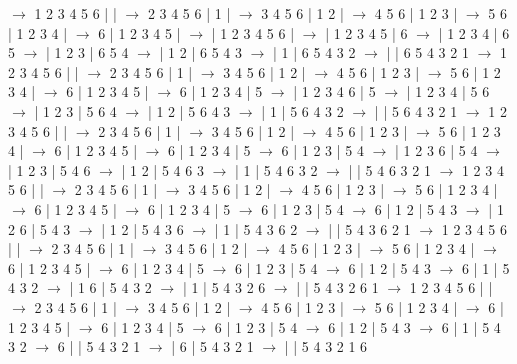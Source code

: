 \documentclass{article}
\begin{document}
\par
$\rightarrow$ 1 2 3 4 5 6 |  |  $\rightarrow$ 2 3 4 5 6 | 1 |  $\rightarrow$ 3 4 5 6 | 1 2 |  $\rightarrow$ 4 5 6 | 1 2 3 |  $\rightarrow$ 5 6 | 1 2 3 4 |  $\rightarrow$ 6 | 1 2 3 4 5 |  $\rightarrow$  | 1 2 3 4 5 6 |  $\rightarrow$  | 1 2 3 4 5 | 6 $\rightarrow$  | 1 2 3 4 | 6 5 $\rightarrow$  | 1 2 3 | 6 5 4 $\rightarrow$  | 1 2 | 6 5 4 3 $\rightarrow$  | 1 | 6 5 4 3 2 $\rightarrow$  |  | 6 5 4 3 2 1
\newline
 $\rightarrow$ 1 2 3 4 5 6 |  |  $\rightarrow$ 2 3 4 5 6 | 1 |  $\rightarrow$ 3 4 5 6 | 1 2 |  $\rightarrow$ 4 5 6 | 1 2 3 |  $\rightarrow$ 5 6 | 1 2 3 4 |  $\rightarrow$ 6 | 1 2 3 4 5 |  $\rightarrow$ 6 | 1 2 3 4 | 5 $\rightarrow$  | 1 2 3 4 6 | 5 $\rightarrow$  | 1 2 3 4 | 5 6 $\rightarrow$  | 1 2 3 | 5 6 4 $\rightarrow$  | 1 2 | 5 6 4 3 $\rightarrow$  | 1 | 5 6 4 3 2 $\rightarrow$  |  | 5 6 4 3 2 1
\newline
 $\rightarrow$ 1 2 3 4 5 6 |  |  $\rightarrow$ 2 3 4 5 6 | 1 |  $\rightarrow$ 3 4 5 6 | 1 2 |  $\rightarrow$ 4 5 6 | 1 2 3 |  $\rightarrow$ 5 6 | 1 2 3 4 |  $\rightarrow$ 6 | 1 2 3 4 5 |  $\rightarrow$ 6 | 1 2 3 4 | 5 $\rightarrow$ 6 | 1 2 3 | 5 4 $\rightarrow$  | 1 2 3 6 | 5 4 $\rightarrow$  | 1 2 3 | 5 4 6 $\rightarrow$  | 1 2 | 5 4 6 3 $\rightarrow$  | 1 | 5 4 6 3 2 $\rightarrow$  |  | 5 4 6 3 2 1
\newline
 $\rightarrow$ 1 2 3 4 5 6 |  |  $\rightarrow$ 2 3 4 5 6 | 1 |  $\rightarrow$ 3 4 5 6 | 1 2 |  $\rightarrow$ 4 5 6 | 1 2 3 |  $\rightarrow$ 5 6 | 1 2 3 4 |  $\rightarrow$ 6 | 1 2 3 4 5 |  $\rightarrow$ 6 | 1 2 3 4 | 5 $\rightarrow$ 6 | 1 2 3 | 5 4 $\rightarrow$ 6 | 1 2 | 5 4 3 $\rightarrow$  | 1 2 6 | 5 4 3 $\rightarrow$  | 1 2 | 5 4 3 6 $\rightarrow$  | 1 | 5 4 3 6 2 $\rightarrow$  |  | 5 4 3 6 2 1
\newline
 $\rightarrow$ 1 2 3 4 5 6 |  |  $\rightarrow$ 2 3 4 5 6 | 1 |  $\rightarrow$ 3 4 5 6 | 1 2 |  $\rightarrow$ 4 5 6 | 1 2 3 |  $\rightarrow$ 5 6 | 1 2 3 4 |  $\rightarrow$ 6 | 1 2 3 4 5 |  $\rightarrow$ 6 | 1 2 3 4 | 5 $\rightarrow$ 6 | 1 2 3 | 5 4 $\rightarrow$ 6 | 1 2 | 5 4 3 $\rightarrow$ 6 | 1 | 5 4 3 2 $\rightarrow$  | 1 6 | 5 4 3 2 $\rightarrow$  | 1 | 5 4 3 2 6 $\rightarrow$  |  | 5 4 3 2 6 1
\newline
 $\rightarrow$ 1 2 3 4 5 6 |  |  $\rightarrow$ 2 3 4 5 6 | 1 |  $\rightarrow$ 3 4 5 6 | 1 2 |  $\rightarrow$ 4 5 6 | 1 2 3 |  $\rightarrow$ 5 6 | 1 2 3 4 |  $\rightarrow$ 6 | 1 2 3 4 5 |  $\rightarrow$ 6 | 1 2 3 4 | 5 $\rightarrow$ 6 | 1 2 3 | 5 4 $\rightarrow$ 6 | 1 2 | 5 4 3 $\rightarrow$ 6 | 1 | 5 4 3 2 $\rightarrow$ 6 |  | 5 4 3 2 1 $\rightarrow$  | 6 | 5 4 3 2 1 $\rightarrow$  |  | 5 4 3 2 1 6
\end{document}
